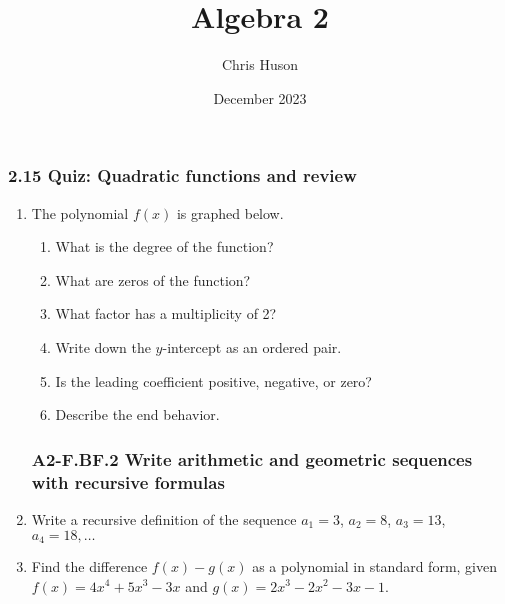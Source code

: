 \documentclass[12pt, twoside]{article}
\title{Algebra 2}
\author{Chris Huson}
\date{December 2023}
\begin{document}
\subsubsection*{2.15 Quiz: Quadratic functions and review}
\begin{enumerate}

\newpage
\setcounter{enumi}{8} %
\subsubsection*{A2-F.IF.7c Graph polynomials, identify zeros, end behavior}
\item The polynomial $f(x)$ is graphed below. 
\begin{multicols}{2}
    \begin{enumerate}[itemsep=0.6cm]
        \item What is the degree of the function?
        \item What are zeros of the function?
        \item What factor has a multiplicity of 2?
        \item Write down the $y$-intercept as an ordered pair.
        \item Is the leading coefficient positive, negative, or zero?
        \item Describe the end behavior.
    \end{enumerate} \vspace{1cm} \;

    \columnbreak

\end{multicols}

\subsubsection*{A2-F.BF.2 Write arithmetic and geometric sequences with recursive formulas}
\item Write a recursive definition of the sequence $a_1 = 3$, $a_2 = 8$, $a_3 = 13$, $a_4 = 18, \ldots$  \vspace{3cm}

\item Find the difference $f(x)-g(x)$ as a polynomial in standard form, given \\[0.25cm]
    $f(x)=4x^4+5x^3-3x$ and $g(x)=2x^3-2x^2-3x-1$.

\end{enumerate}
\end{document}
